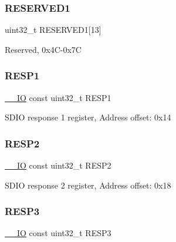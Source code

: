 \subsubsection{\texorpdfstring{R\+E\+S\+E\+R\+V\+E\+D1}{RESERVED1}}
{\footnotesize\ttfamily uint32\+\_\+t R\+E\+S\+E\+R\+V\+E\+D1\mbox{[}13\mbox{]}}

Reserved, 0x4\+C-\/0x7C \mbox{\label{struct_s_d_i_o___type_def_a7da778413f6db1f83ae25caed03382d4}} 
\subsubsection{\texorpdfstring{R\+E\+S\+P1}{RESP1}}
{\footnotesize\ttfamily \mbox{\hyperlink{core__sc300_8h_aec43007d9998a0a0e01faede4133d6be}{\+\_\+\+\_\+\+IO}} const uint32\+\_\+t R\+E\+S\+P1}

S\+D\+IO response 1 register, Address offset\+: 0x14 \mbox{\label{struct_s_d_i_o___type_def_a44614d7422faffd14af83884e76b2d3e}} 
\subsubsection{\texorpdfstring{R\+E\+S\+P2}{RESP2}}
{\footnotesize\ttfamily \mbox{\hyperlink{core__sc300_8h_aec43007d9998a0a0e01faede4133d6be}{\+\_\+\+\_\+\+IO}} const uint32\+\_\+t R\+E\+S\+P2}

S\+D\+IO response 2 register, Address offset\+: 0x18 \mbox{\label{struct_s_d_i_o___type_def_a270ee3c6e9f87e5851422ae0ef255fd4}} 
\subsubsection{\texorpdfstring{R\+E\+S\+P3}{RESP3}}
{\footnotesize\ttfamily \mbox{\hyperlink{core__sc300_8h_aec43007d9998a0a0e01faede4133d6be}{\+\_\+\+\_\+\+IO}} const uint32\+\_\+t R\+E\+S\+P3}


